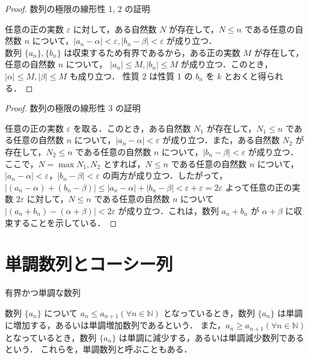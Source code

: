 \documentclass[a4paper]{ltjsarticle}
\begin{document}
\begin{proof}{数列の極限の線形性 1, 2 の証明}{}

任意の正の実数 $\varepsilon$ に対して，ある自然数 $N$ が存在して，$N \leq n$ である任意の自然数 $n$ について，$|a_n - \alpha| < \varepsilon, |b_n - \beta| < \varepsilon$ が成り立つ．
\\
数列 $\{a_n\}, \{b_n\}$ は収束するため有界であるから，ある正の実数 $M$ が存在して，任意の自然数 $n$ について， $|a_n| \leq M, |b_n| \leq M$ が成り立つ．このとき，$|\alpha| \leq M, |\beta| \leq M$ も成り立つ．
性質 2 は性質 1 の $b_n$ を $k$ とおくと得られる．

\end{proof}

\begin{proof}{数列の極限の線形性 3 の証明}{}

任意の正の実数 $\varepsilon$ を取る．このとき，ある自然数 $N_1$ が存在して，$N_1 \leq n$ である任意の自然数 $n$ について，$|a_n - \alpha| < \varepsilon$ が成り立つ．また，ある自然数 $N_2$ が存在して，$N_2 \leq n$ である任意の自然数 $n$ について，$|b_n - \beta| < \varepsilon$ が成り立つ．
\\
ここで，$N = \max {N_1, N_2}$ とすれば，$N \leq n$ である任意の自然数 $n$ について，$|a_n - \alpha| < \varepsilon，|b_n - \beta| < \varepsilon$ の両方が成り立つ．したがって，$|(a_n - \alpha) + (b_n - \beta)| \leq |a_n - \alpha| + |b_n - \beta| < \varepsilon + \varepsilon = 2\varepsilon$ よって任意の正の実数 $2\varepsilon$ に対して，$N \leq n$ である任意の自然数 $n$ について $|(a_n + b_n) - (\alpha + \beta)| < 2\varepsilon$ が成り立つ．これは，数列 ${a_n + b_n}$ が $\alpha + \beta$ に収束することを示している．

\end{proof}

\section{単調数列とコーシー列}
\begin{tcb}{有界かつ単調な数列}{}

数列 $\{a_n\}$ について $a_n \leq a_{n+1} (\forall n \in \mathbb{N})$ となっているとき，数列 $\{a_n\}$ は単調に増加する，あるいは単調増加数列であるという．
また，$a_n \geq a_{n+1} (\forall n \in \mathbb{N})$ となっているとき，数列 $\{a_n\}$ は単調に減少する，あるいは単調減少数列であるという．
これらを，単調数列と呼ぶこともある．

\end{tcb}
\end{document}
